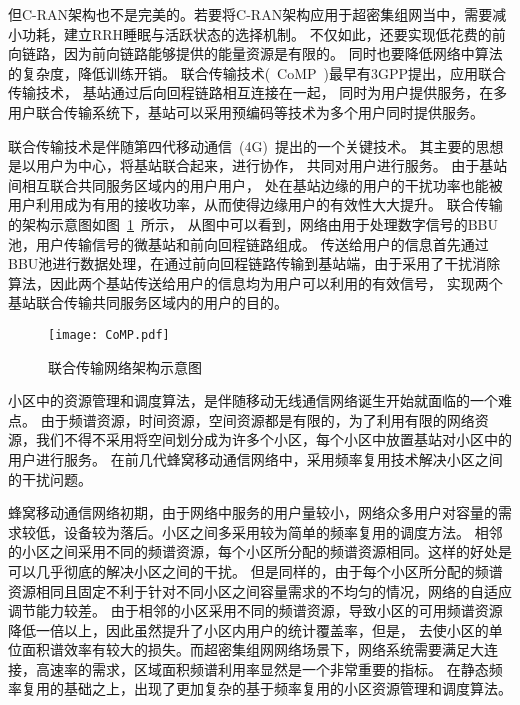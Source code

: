 但C-RAN架构也不是完美的。若要将C-RAN架构应用于超密集组网当中，需要减小功耗，建立RRH睡眠与活跃状态的选择机制。
不仅如此，还要实现低花费的前向链路，因为前向链路能够提供的能量资源是有限的。
同时也要降低网络中算法的复杂度，降低训练开销。
联合传输技术(~CoMP~)最早有3GPP提出，应用联合传输技术，
基站通过后向回程链路相互连接在一起，
同时为用户提供服务，在多用户联合传输系统下，基站可以采用预编码等技术为多个用户同时提供服务。

联合传输技术是伴随第四代移动通信~(4G)~提出的一个关键技术。
其主要的思想是以用户为中心，将基站联合起来，进行协作，
共同对用户进行服务。
由于基站间相互联合共同服务区域内的用户用户，
处在基站边缘的用户的干扰功率也能被用户利用成为有用的接收功率，从而使得边缘用户的有效性大大提升。
联合传输的架构示意图如图~\ref{CoMP}~所示，
从图中可以看到，网络由用于处理数字信号的BBU池，用户传输信号的微基站和前向回程链路组成。
传送给用户的信息首先通过BBU池进行数据处理，在通过前向回程链路传输到基站端，由于采用了干扰消除算法，因此两个基站传送给用户的信息均为用户可以利用的有效信号，
实现两个基站联合传输共同服务区域内的用户的目的。
\begin{figure}[htbp]
\centering
\texttt{[image: CoMP.pdf]}
\caption{联合传输网络架构示意图}\vspace{-0.5em}
\label{CoMP}
\end{figure}

小区中的资源管理和调度算法，是伴随移动无线通信网络诞生开始就面临的一个难点。
由于频谱资源，时间资源，空间资源都是有限的，为了利用有限的网络资源，我们不得不采用将空间划分成为许多个小区，每个小区中放置基站对小区中的用户进行服务。
在前几代蜂窝移动通信网络中，采用频率复用技术解决小区之间的干扰问题。

蜂窝移动通信网络初期，由于网络中服务的用户量较小，网络众多用户对容量的需求较低，设备较为落后。小区之间多采用较为简单的频率复用的调度方法。
相邻的小区之间采用不同的频谱资源，每个小区所分配的频谱资源相同。这样的好处是可以几乎彻底的解决小区之间的干扰。
但是同样的，由于每个小区所分配的频谱资源相同且固定不利于针对不同小区之间容量需求的不均匀的情况，网络的自适应调节能力较差。
由于相邻的小区采用不同的频谱资源，导致小区的可用频谱资源降低一倍以上，因此虽然提升了小区内用户的统计覆盖率，但是，
去使小区的单位面积谱效率有较大的损失。而超密集组网网络场景下，网络系统需要满足大连接，高速率的需求，区域面积频谱利用率显然是一个非常重要的指标。
在静态频率复用的基础之上，出现了更加复杂的基于频率复用的小区资源管理和调度算法。

